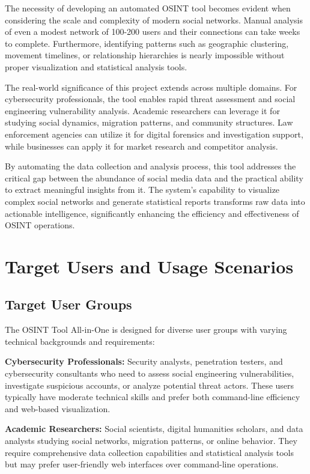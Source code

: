 \documentclass[13pt,a4paper]{report}
\begin{document}
The necessity of developing an automated OSINT tool becomes evident when considering the scale and complexity of modern social networks. Manual analysis of even a modest network of 100-200 users and their connections can take weeks to complete. Furthermore, identifying patterns such as geographic clustering, movement timelines, or relationship hierarchies is nearly impossible without proper visualization and statistical analysis tools.

The real-world significance of this project extends across multiple domains. For cybersecurity professionals, the tool enables rapid threat assessment and social engineering vulnerability analysis. Academic researchers can leverage it for studying social dynamics, migration patterns, and community structures. Law enforcement agencies can utilize it for digital forensics and investigation support, while businesses can apply it for market research and competitor analysis.

By automating the data collection and analysis process, this tool addresses the critical gap between the abundance of social media data and the practical ability to extract meaningful insights from it. The system's capability to visualize complex social networks and generate statistical reports transforms raw data into actionable intelligence, significantly enhancing the efficiency and effectiveness of OSINT operations.

\section{Target Users and Usage Scenarios}
\subsection{Target User Groups}
The OSINT Tool All-in-One is designed for diverse user groups with varying technical backgrounds and requirements:

\textbf{Cybersecurity Professionals:} Security analysts, penetration testers, and cybersecurity consultants who need to assess social engineering vulnerabilities, investigate suspicious accounts, or analyze potential threat actors. These users typically have moderate technical skills and prefer both command-line efficiency and web-based visualization.

\textbf{Academic Researchers:} Social scientists, digital humanities scholars, and data analysts studying social networks, migration patterns, or online behavior. They require comprehensive data collection capabilities and statistical analysis tools but may prefer user-friendly web interfaces over command-line operations.
\end{document}

